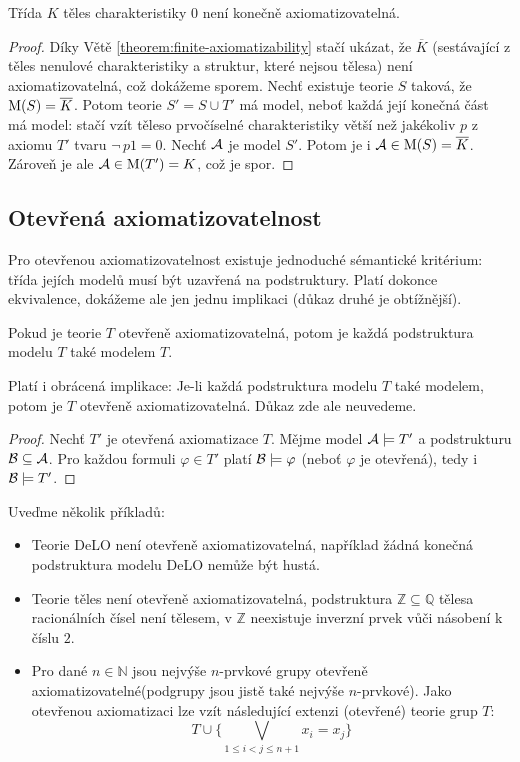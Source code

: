 \begin{proposition}
Třída $K$ těles charakteristiky $0$ není konečně axiomatizovatelná.
\end{proposition}
\begin{proof}
Díky Větě \ref{theorem:finite-axiomatizability} stačí ukázat, že $\overline{K}$ (sestávající z těles nenulové charakteristiky a struktur, které nejsou tělesa) není axiomatizovatelná, což dokážeme sporem. Nechť existuje teorie $S$ taková, že $\operatorname{M}(S)=\overline{K}$. Potom teorie
$S'=S\cup T'$ má model, neboť každá její konečná část má model: stačí vzít těleso prvočíselné charakteristiky větší než jakékoliv $p$ z axiomu $T'$ tvaru $\neg\, p1=0$. Nechť $\mathcal{A}$ je model $S'$. Potom je i $\mathcal{A}\in\operatorname{M}(S)=\overline{K}$. Zároveň je ale $\mathcal{A}\in\operatorname{M}(T')=K$, což je spor.
\end{proof}

\subsection{Otevřená axiomatizovatelnost}

Pro otevřenou axiomatizovatelnost existuje jednoduché sémantické kritérium: třída jejích modelů musí být uzavřená na podstruktury. Platí dokonce ekvivalence, dokážeme ale jen jednu implikaci (důkaz druhé je obtížnější).

\begin{theorem}\label{theorem:open-axiomatizability}
Pokud je teorie $T$ otevřeně axiomatizovatelná, potom je každá podstruktura modelu $T$ také modelem $T$.
\end{theorem}

\begin{remark}
    Platí i obrácená implikace: Je-li každá podstruktura modelu $T$ také modelem, potom je $T$ otevřeně axiomatizovatelná. Důkaz zde ale neuvedeme.
\end{remark}

\begin{proof}
Nechť $T'$ je otevřená axiomatizace $T$. Mějme model $\mathcal{A}\models T'$  a podstrukturu $\mathcal{B}\subseteq\mathcal{A}$. Pro každou formuli $\varphi\in T'$ platí $\mathcal{B}\models\varphi$ (neboť $\varphi$ je otevřená), tedy i $\mathcal{B}\models T'$.
\end{proof}

\begin{example}
    Uveďme několik příkladů:
    \begin{itemize}
        \item Teorie DeLO není otevřeně axiomatizovatelná, například žádná konečná podstruktura modelu DeLO nemůže být hustá.
        \item Teorie těles není otevřeně axiomatizovatelná, podstruktura $\mathbb Z\subseteq\mathbb Q$ tělesa racionálních čísel není tělesem, v $\mathbb Z$ neexistuje inverzní prvek vůči násobení k číslu $2$.
        \item Pro dané $n\in\mathbb N$ jsou nejvýše $n$-prvkové grupy otevřeně axiomatizovatelné(podgrupy jsou jistě také nejvýše $n$-prvkové). Jako otevřenou axiomatizaci lze vzít následující extenzi (otevřené) teorie grup $T$:
        $$
        T\cup \{\bigvee_{1\leq i<j\leq n+1}x_i=x_j\}
        $$
    \end{itemize}
\end{example}
